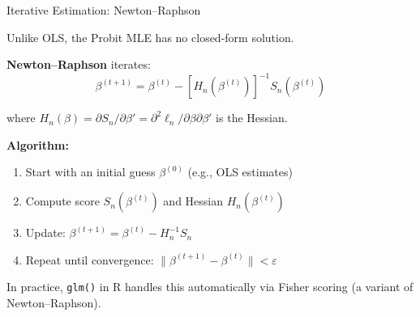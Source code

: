 \documentclass[aspectratio=169]{beamer}
\numberwithin{equation}{section}
\begin{document}

\begin{frame}{Iterative Estimation: Newton--Raphson}

Unlike OLS, the Probit MLE has no closed-form solution.

\pause

\textbf{Newton--Raphson} iterates:
\[
\beta^{(t+1)} = \beta^{(t)} - \left[H_n(\beta^{(t)})\right]^{-1} S_n(\beta^{(t)})
\]

where $H_n(\beta) = \partial S_n / \partial \beta' = \partial^2 \ell_n / \partial \beta \partial \beta'$ is the Hessian.

\pause

\bigskip

\textbf{Algorithm:}
\begin{enumerate}
    \item Start with an initial guess $\beta^{(0)}$ (e.g., OLS estimates)
    \item Compute score $S_n(\beta^{(t)})$ and Hessian $H_n(\beta^{(t)})$
    \item Update: $\beta^{(t+1)} = \beta^{(t)} - H_n^{-1} S_n$
    \item Repeat until convergence: $\|\beta^{(t+1)} - \beta^{(t)}\| < \varepsilon$
\end{enumerate}

\pause

In practice, \texttt{glm()} in R handles this automatically via Fisher scoring (a variant of Newton--Raphson).

\end{frame}

\end{document}
